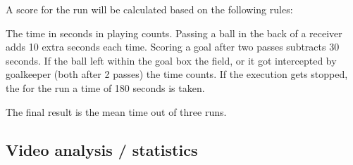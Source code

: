     A score for the run will be calculated based on the following rules:

    The time in seconds in playing counts. Passing a ball in the back of a receiver adds 10 extra seconds each time. Scoring a goal after two passes subtracts 30 seconds.
    If the ball left within the goal box the field, or it got intercepted by goalkeeper (both after 2 passes) the time counts.
    If the execution gets stopped, the for the run a time of 180 seconds is taken.

    The final result is the mean time out of three runs.

\subsection{Video analysis / statistics}
